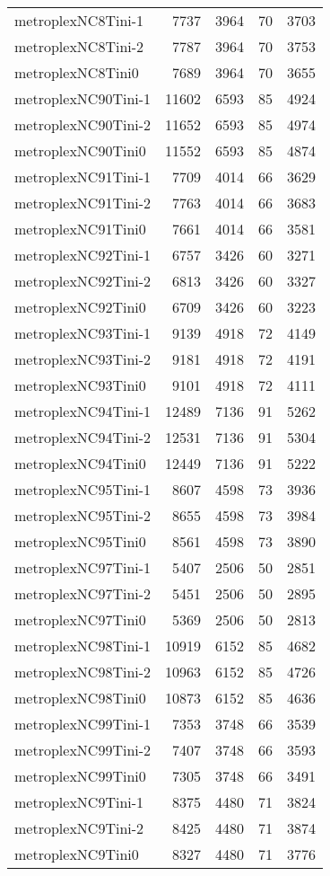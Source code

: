 \begin{longtable}{lrrrr}
metroplexNC8Tini-1 & 7737 & 3964 & 70 & 3703 \\
metroplexNC8Tini-2 & 7787 & 3964 & 70 & 3753 \\
metroplexNC8Tini0 & 7689 & 3964 & 70 & 3655 \\
metroplexNC90Tini-1 & 11602 & 6593 & 85 & 4924 \\
metroplexNC90Tini-2 & 11652 & 6593 & 85 & 4974 \\
metroplexNC90Tini0 & 11552 & 6593 & 85 & 4874 \\
metroplexNC91Tini-1 & 7709 & 4014 & 66 & 3629 \\
metroplexNC91Tini-2 & 7763 & 4014 & 66 & 3683 \\
metroplexNC91Tini0 & 7661 & 4014 & 66 & 3581 \\
metroplexNC92Tini-1 & 6757 & 3426 & 60 & 3271 \\
metroplexNC92Tini-2 & 6813 & 3426 & 60 & 3327 \\
metroplexNC92Tini0 & 6709 & 3426 & 60 & 3223 \\
metroplexNC93Tini-1 & 9139 & 4918 & 72 & 4149 \\
metroplexNC93Tini-2 & 9181 & 4918 & 72 & 4191 \\
metroplexNC93Tini0 & 9101 & 4918 & 72 & 4111 \\
metroplexNC94Tini-1 & 12489 & 7136 & 91 & 5262 \\
metroplexNC94Tini-2 & 12531 & 7136 & 91 & 5304 \\
metroplexNC94Tini0 & 12449 & 7136 & 91 & 5222 \\
metroplexNC95Tini-1 & 8607 & 4598 & 73 & 3936 \\
metroplexNC95Tini-2 & 8655 & 4598 & 73 & 3984 \\
metroplexNC95Tini0 & 8561 & 4598 & 73 & 3890 \\
metroplexNC97Tini-1 & 5407 & 2506 & 50 & 2851 \\
metroplexNC97Tini-2 & 5451 & 2506 & 50 & 2895 \\
metroplexNC97Tini0 & 5369 & 2506 & 50 & 2813 \\
metroplexNC98Tini-1 & 10919 & 6152 & 85 & 4682 \\
metroplexNC98Tini-2 & 10963 & 6152 & 85 & 4726 \\
metroplexNC98Tini0 & 10873 & 6152 & 85 & 4636 \\
metroplexNC99Tini-1 & 7353 & 3748 & 66 & 3539 \\
metroplexNC99Tini-2 & 7407 & 3748 & 66 & 3593 \\
metroplexNC99Tini0 & 7305 & 3748 & 66 & 3491 \\
metroplexNC9Tini-1 & 8375 & 4480 & 71 & 3824 \\
metroplexNC9Tini-2 & 8425 & 4480 & 71 & 3874 \\
metroplexNC9Tini0 & 8327 & 4480 & 71 & 3776 \\
\end{longtable}
